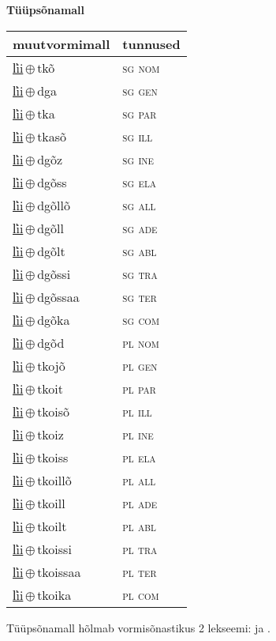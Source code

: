 

\vspace{3.5em}
\noindent \begin{minipage}{\textwidth}
\noindent \textbf{Tüüpsõnamall \,}\\

\begin{sideways}
\begin{tabular}{l l}
muutvormimall & tunnused \\
\hline
\underline{l̕ii}\,$\oplus$\,tkõ & \textsc{ sg nom } \\
\underline{l̕ii}\,$\oplus$\,dga & \textsc{ sg gen } \\
\underline{l̕ii}\,$\oplus$\,tka & \textsc{ sg par } \\
\underline{l̕ii}\,$\oplus$\,tkasõ & \textsc{ sg ill } \\
\underline{l̕ii}\,$\oplus$\,dgõz & \textsc{ sg ine } \\
\underline{l̕ii}\,$\oplus$\,dgõss & \textsc{ sg ela } \\
\underline{l̕ii}\,$\oplus$\,dgõllõ & \textsc{ sg all } \\
\underline{l̕ii}\,$\oplus$\,dgõll & \textsc{ sg ade } \\
\underline{l̕ii}\,$\oplus$\,dgõlt & \textsc{ sg abl } \\
\underline{l̕ii}\,$\oplus$\,dgõssi & \textsc{ sg tra } \\
\underline{l̕ii}\,$\oplus$\,dgõssaa & \textsc{ sg ter } \\
\underline{l̕ii}\,$\oplus$\,dgõka & \textsc{ sg com } \\
\underline{l̕ii}\,$\oplus$\,dgõd & \textsc{ pl nom } \\
\underline{l̕ii}\,$\oplus$\,tkojõ & \textsc{ pl gen } \\
\underline{l̕ii}\,$\oplus$\,tkoit & \textsc{ pl par } \\
\underline{l̕ii}\,$\oplus$\,tkoisõ & \textsc{ pl ill } \\
\underline{l̕ii}\,$\oplus$\,tkoiz & \textsc{ pl ine } \\
\underline{l̕ii}\,$\oplus$\,tkoiss & \textsc{ pl ela } \\
\underline{l̕ii}\,$\oplus$\,tkoillõ & \textsc{ pl all } \\
\underline{l̕ii}\,$\oplus$\,tkoill & \textsc{ pl ade } \\
\underline{l̕ii}\,$\oplus$\,tkoilt & \textsc{ pl abl } \\
\underline{l̕ii}\,$\oplus$\,tkoissi & \textsc{ pl tra } \\
\underline{l̕ii}\,$\oplus$\,tkoissaa & \textsc{ pl ter } \\
\underline{l̕ii}\,$\oplus$\,tkoika & \textsc{ pl com } \\
\end{tabular}
\end{sideways}
\label{tab:tüüpsõnamall-l̕iitkõ}

\end{minipage}

 
\vspace{1em}
\noindent Tüüpsõnamall  hõlmab vormisõnastikus 2 lekseemi:  ja .
